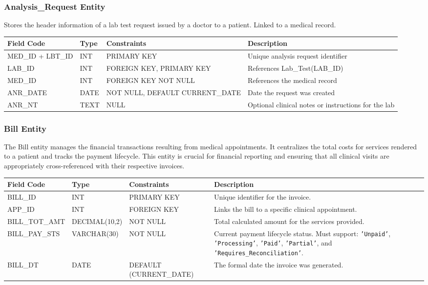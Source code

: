 \subsubsection{Analysis\_Request Entity}
Stores the header information of a lab test request issued by a doctor to a patient. Linked to a medical record.

\begin{table}[H]
	\centering
	\small
	\renewcommand{\arraystretch}{1.3}
	\begin{tabularx}{\textwidth}{l l l X}
		\toprule
		\rowcolor[gray]{0.9} \textbf{Field Code} & \textbf{Type} & \textbf{Constraints} & \textbf{Description} \\
		\midrule
		MED\_ID + LBT\_ID    & INT  & PRIMARY KEY& Unique analysis request identifier \\
		LAB\_ID  	 & INT  & FOREIGN KEY, PRIMARY KEY & References Lab\_Test(LAB\_ID) \\
		MED\_ID      & INT  & FOREIGN KEY  NOT NULL & References the medical record \\
		ANR\_DATE    & DATE & NOT NULL, DEFAULT CURRENT\_DATE & Date the request was created \\
		ANR\_NT   	 & TEXT & NULL & Optional clinical notes or instructions for the lab \\
		\bottomrule
	\end{tabularx}
\end{table}
\subsubsection{Bill Entity}
The Bill entity manages the financial transactions resulting from medical appointments. It centralizes the total costs for services rendered to a patient and tracks the payment lifecycle. This entity is crucial for financial reporting and ensuring that all clinical visits are appropriately cross-referenced with their respective invoices.

\begin{table}[H]
	\centering
	\small
	\renewcommand{\arraystretch}{1.4}
	\begin{tabularx}{\textwidth}{l l l X}
		\toprule
		\rowcolor[gray]{0.9} \textbf{Field Code} & \textbf{Type} & \textbf{Constraints} & \textbf{Description} \\
		\midrule
		BILL\_ID & INT & PRIMARY KEY & Unique identifier for the invoice. \\
		APP\_ID  & INT & FOREIGN KEY & Links the bill to a specific clinical appointment. \\
		BILL\_TOT\_AMT & DECIMAL(10,2) & NOT NULL & Total calculated amount for the services provided. \\
		BILL\_PAY\_STS & VARCHAR(30) & NOT NULL & Current payment lifecycle status. Must support: \texttt{'Unpaid'}, \texttt{'Processing'}, \texttt{'Paid'}, \texttt{'Partial'}, and \texttt{'Requires\_Reconciliation'}. \\
		BILL\_DT & DATE & DEFAULT (CURRENT\_DATE) & The formal date the invoice was generated. \\
		\bottomrule
	\end{tabularx}
\end{table}

